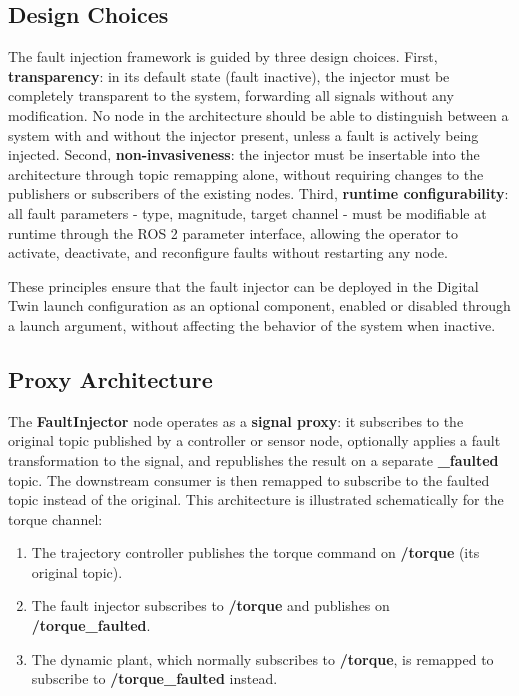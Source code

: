\subsection{Design Choices}
The fault injection framework is guided by three design choices. First, \textbf{transparency}: in its default state (fault inactive), the injector must be completely transparent to the system, forwarding all signals without any modification. No node in the architecture should be able to distinguish between a system with and without the injector present, unless a fault is actively being injected. Second, \textbf{non-invasiveness}: the injector must be insertable into the architecture through topic remapping alone, without requiring changes to the publishers or subscribers of the existing nodes. Third, \textbf{runtime configurability}: all fault parameters - type, magnitude, target channel - must be modifiable at runtime through the ROS 2 parameter interface, allowing the operator to activate, deactivate, and reconfigure faults without restarting any node.

These principles ensure that the fault injector can be deployed in the Digital Twin launch configuration as an optional component, enabled or disabled through a launch argument, without affecting the behavior of the system when inactive.

\subsection{Proxy Architecture}
The \textbf{FaultInjector} node operates as a \textbf{signal proxy}: it subscribes to the original topic published by a controller or sensor node, optionally applies a fault transformation to the signal, and republishes the result on a separate \textbf{\_faulted} topic. The downstream consumer is then remapped to subscribe to the faulted topic instead of the original. This architecture is illustrated schematically for the torque channel:

\begin{enumerate}
    \item The trajectory controller publishes the torque command on \textbf{/torque} (its original topic).
    \item The fault injector subscribes to \textbf{/torque} and publishes on \textbf{/torque\_faulted}.
    \item The dynamic plant, which normally subscribes to \textbf{/torque}, is remapped to subscribe to \textbf{/torque\_faulted} instead.
\end{enumerate}

